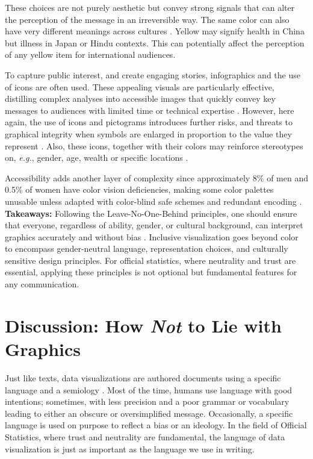 \documentclass[11pt,twoside,a4paper]{article}
\begin{document}
These choices are not purely aesthetic but convey strong signals that can alter the perception of the message in an irreversible way. The same color can also have very different meanings across cultures \citep{mccandless2012information}. Yellow may signify health in China but illness in Japan or Hindu contexts. This can potentially affect the perception of any yellow item for international audiences.

 To capture public interest, and create engaging stories, infographics and the use of icons are  often used. These appealing visuals are  particularly effective, distilling complex analyses into accessible images that quickly convey key messages  to audiences with limited time or technical expertise \citep{page2021DTVCovid}. However, here again, the use of icons and pictograms introduces further risks, and threats to   graphical integrity when symbols are enlarged in proportion to the value they represent \citep{Tufte2001}. Also, these icons, together with their colors may reinforce stereotypes on, \textit{e.g.}, gender, age, wealth or specific locations \citep{ UNVolunteers2020, or2013data}.

 Accessibility adds another layer of complexity since approximately 8\% of men and 0.5\% of women have color vision deficiencies, making some color palettes unusable unless adapted with color-blind safe schemes and redundant encoding \citep{muth2018color}.\\

 \noindent \textbf{ Takeaways:}  Following the Leave-No-One-Behind principles, one should ensure that everyone, regardless of ability, gender, or cultural background, can interpret graphics accurately and without bias \citep{Schwabish2022}. Inclusive visualization  goes beyond color to encompass gender-neutral language, representation choices, and culturally sensitive design principles. For official statistics, where neutrality and trust are essential, applying these principles is not optional but  fundamental features for any communication.

\section{ Discussion: How \textit{Not} to Lie with Graphics}

Just like  texts,  data visualizations are authored documents using a specific language and a semiology \citep{Bertin1983English}. Most of the time, humans use language with good intentions; sometimes, with less precision and a poor grammar or vocabulary leading to either an obscure or oversimplified message. Occasionally, a specific language is used on purpose to reflect a bias or an ideology. In the field of Official Statistics, where trust and neutrality are fundamental, the language of data visualization is just as important as the language we use in writing.\\
\end{document}

